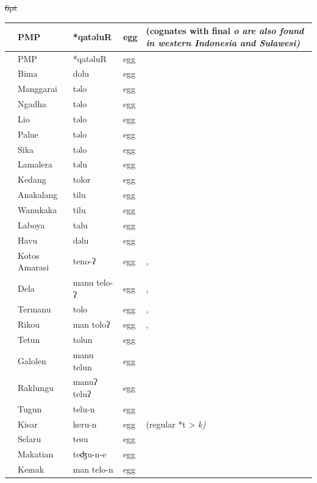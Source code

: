 {\st{6pt}\begin{xltabular}[l]{\linewidth}
{>{\hspace{-\tabcolsep}}l<{\hspace{-\tabcolsep}}
>{\hspace{-\tabcolsep}\enspace}lll
>{\raggedright\arraybackslash}X}
\lsptoprule
{}	&	PMP	&	*qatəluR	&	egg	&	(cognates with final \it{o} are also found in western Indonesia and Sulawesi)	\\	\midrule
\endfirsthead
\lsptoprule
{}	&	PMP	&	*qatəluR	&	egg	&	\\	\midrule
\endhead
	&	Bima	&	dolu	&	egg	&		\\
\rcl	&	Manggarai	&	təlo	&	egg	&		\\
\rcl	&	Ngadha	&	təlo	&	egg	&		\\
\rcl	&	Lio	&	təlo	&	egg	&		\\
\rcl	&	Palu{\Q}e	&	təlo	&	egg	&		\\
\rcl	&	Sika	&	təlo	&	egg	&		\\
	&	Lamalera	&	təlu	&	egg	&		\\
\rcl	&	Kedang	&	tolor	&	egg	&		\\
	&	Anakalang	&	tilu	&	egg	&		\\
	&	Wanukaka	&	tilu	&	egg	&		\\
	&	Laboya	&	talu	&	egg	&		\\
	&	Havu	&	dəlu	&	egg	&		\\
\rcl	&	Kotos Amarasi	&	teno-ʔ	&	egg	&	, 	\\
\rcl	&	Dela	&	manu telo-ʔ	&	egg	&	, 	\\
\rcl	&	Termanu	&	tolo	&	egg	&	, 	\\
\rcl	&	Rikou	&	man toloʔ	&	egg	&	, 	\\
	&	Tetun	&	tolun	&	egg	&		\\
	&	Galolen	&	manu telun	&	egg	&		\\
	&	Raklungu	&	manuʔ teluʔ	&	egg	&		\\
	&	Tugun	&	telu-n	&	egg	&		\\
	&	Kisar	&	keru-n	&	egg	&	 (regular *t > \it{k})	\\
	&	Selaru	&	tesu	&	egg	&		\\
	&	Makatian	&	teʤu-n-e	&	egg	&		\\
\rcl	&	Kemak	&	man telo-n	&	egg	&		\\

\end{xltabular}}
